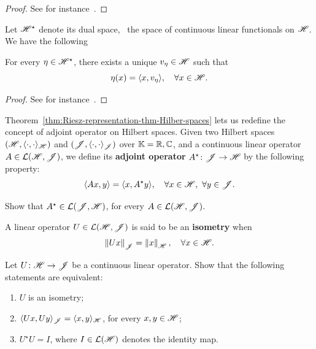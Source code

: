\begin{proof}
  See for instance~\cite[Theorem 3.13 and Corollary 3.17]{EinsiedlerWardFunctionalAnalysisBook}.
\end{proof}

Let $\mathscr{H}^{\star}$ denote its dual space, \ie~the space of continuous linear functionals on $\mathscr{H}$. We have the following

\begin{theorem}\label{thm:Riesz-representation-thm-Hilber-spaces}
  For every $\eta\in\mathscr{H}^{\star}$, there exists a unique $v_{\eta}\in\mathscr{H}$ such that
  \begin{displaymath}
    \eta(x)=\langle x,v_{\eta}\rangle, \quad\forall x\in\mathscr{H}.
  \end{displaymath}
\end{theorem}

\begin{proof}
  See for instance~\cite[Corollary 3.19]{EinsiedlerWardFunctionalAnalysisBook}.
\end{proof}

Theorem~\ref{thm:Riesz-representation-thm-Hilber-spaces} lets us redefine the concept of adjoint operator on Hilbert spaces. Given two Hilbert spaces $(\mathscr{H},\langle\cdot,\cdot\rangle_{\mathscr{H}})$ and $(\mathscr{J},\langle\cdot,\cdot\rangle_{\mathscr{J}})$ over $\mathbb{K}=\mathbb{R},\mathbb{C}$, and a continuous linear operator $A\in\mathcal{L}(\mathscr{H},\mathscr{J})$, we define its \textbf{adjoint operator} $A^{\star}\colon\mathscr{J}\to\mathscr{H}$ by the following property:
\begin{displaymath}
  \langle Ax,y\rangle = \langle x, A^{\star}y\rangle, \quad\forall x\in\mathscr{H},\ \forall y\in\mathscr{J}.
\end{displaymath}

\begin{exercise}
  Show that $A^{\star}\in\mathcal{L}(\mathscr{J},\mathscr{H})$, for every $A\in\mathcal{L}(\mathscr{H},\mathscr{J})$.
\end{exercise}

A linear operator $U\in\mathcal{L}(\mathscr{H},\mathscr{J})$ is said to be an \textbf{isometry} when
\begin{displaymath}
  \left\|{Ux}\right\|_{\mathscr{J}}=\left\|{x}\right\|_{\mathscr{H}}, \quad\forall x\in\mathscr{H}.
\end{displaymath}

\begin{exercise}\label{exer:isometries-Hilber-spaces}
  Let $U\colon\mathscr{H}\to\mathscr{J}$ be a continuous linear operator. Show that the following statements are equivalent:
  \begin{enumerate}
    \item $U$ is an isometry;
    \item $\langle Ux,Uy\rangle_{\mathscr{J}}=\langle x,y\rangle_{\mathscr{H}}$, for every $x,y\in\mathscr{H}$;
    \item $U^{\star}U=I$, where $I\in\mathcal{L}(\mathscr{H})$ denotes the identity map.
  \end{enumerate}
\end{exercise}

